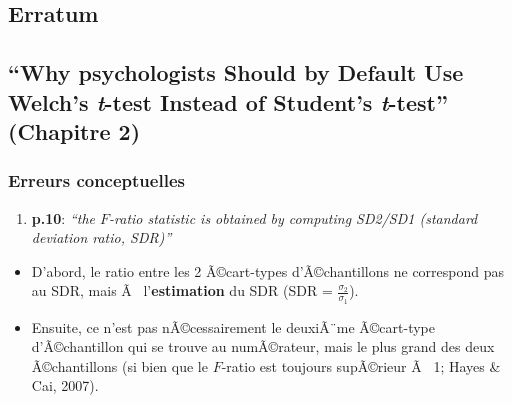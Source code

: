 \clearpage



\begin{appendix}
\hypertarget{erratum}{%
\section{Erratum}\label{erratum}}

\hypertarget{why-psychologists-should-by-default-use-welchs-t-test-instead-of-students-t-test-chapitre-2}{%
\subsection{\texorpdfstring{``Why psychologists Should by Default Use
Welch's \emph{t}-test Instead of Student's \emph{t}-test'' (Chapitre
2)}{``Why psychologists Should by Default Use Welch's t-test Instead of Student's t-test'' (Chapitre 2)}}\label{why-psychologists-should-by-default-use-welchs-t-test-instead-of-students-t-test-chapitre-2}}

\hypertarget{erreurs-conceptuelles}{%
\subsubsection{Erreurs conceptuelles}\label{erreurs-conceptuelles}}

\begin{enumerate}
\def\labelenumi{\arabic{enumi})}
\tightlist
\item
  \textbf{p.10}: \emph{``the \(F\)-ratio statistic is obtained by
  computing SD2/SD1 (standard deviation ratio, SDR)''}
\end{enumerate}

\begin{itemize}
\tightlist
\item
  D'abord, le ratio entre les 2 Ã©cart-types d'Ã©chantillons ne
  correspond pas au SDR, mais Ã~ l'\textbf{estimation} du SDR (SDR =
  \(\frac{\sigma_2}{\sigma_1}\)).\\
\item
  Ensuite, ce n'est pas nÃ©cessairement le deuxiÃ¨me Ã©cart-type
  d'Ã©chantillon qui se trouve au numÃ©rateur, mais le plus grand des
  deux Ã©chantillons (si bien que le \(F\)-ratio est toujours supÃ©rieur
  Ã~ 1; Hayes \& Cai, 2007).
\end{itemize}


\end{appendix}
